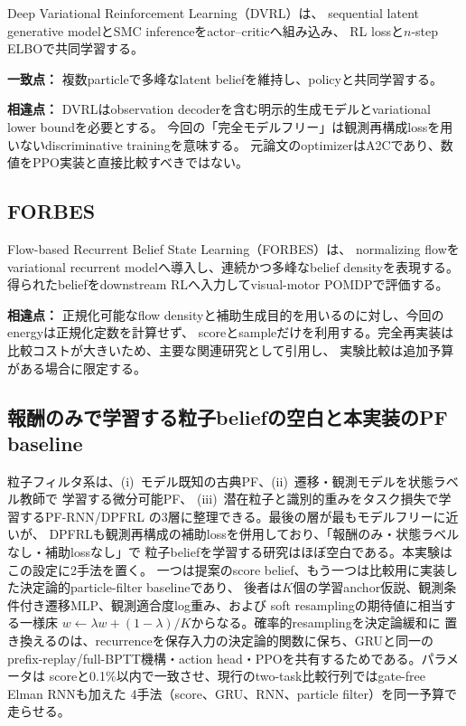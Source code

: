 \documentclass[a4paper,11pt]{article}
\newcommand{\matchpoint}{\par\noindent\textbf{一致点：}}
\newcommand{\difference}{\par\noindent\textbf{相違点：}}
\begin{document}
Deep Variational Reinforcement Learning（DVRL）\cite{igl2018dvrl}は、
sequential latent generative modelとSMC inferenceをactor--criticへ組み込み、
RL lossと$n$-step ELBOで共同学習する。

\matchpoint
複数particleで多峰なlatent beliefを維持し、policyと共同学習する。

\difference
DVRLはobservation decoderを含む明示的生成モデルとvariational lower boundを必要とする。
今回の「完全モデルフリー」は観測再構成lossを用いないdiscriminative trainingを意味する。
元論文のoptimizerはA2Cであり、数値をPPO実装と直接比較すべきではない。

\subsection{FORBES}

Flow-based Recurrent Belief State Learning（FORBES）\cite{chen2022forbes}は、
normalizing flowをvariational recurrent modelへ導入し、連続かつ多峰なbelief densityを表現する。
得られたbeliefをdownstream RLへ入力してvisual-motor POMDPで評価する。

\difference
正規化可能なflow densityと補助生成目的を用いるのに対し、今回のenergyは正規化定数を計算せず、
scoreとsampleだけを利用する。完全再実装は比較コストが大きいため、主要な関連研究として引用し、
実験比較は追加予算がある場合に限定する。

\subsection{報酬のみで学習する粒子beliefの空白と本実装のPF baseline}

粒子フィルタ系は、(i)~モデル既知の古典PF、(ii)~遷移・観測モデルを状態ラベル教師で
学習する微分可能PF\cite{jonschkowski2018dpf,karkus2018pfnet}、
(iii)~潜在粒子と識別的重みをタスク損失で学習するPF-RNN/DPFRL
\cite{ma2020pfrnn,ma2020dpfrl}の3層に整理できる。最後の層が最もモデルフリーに近いが、
DPFRLも観測再構成の補助lossを併用しており、「報酬のみ・状態ラベルなし・補助lossなし」で
粒子beliefを学習する研究はほぼ空白である。本実験はこの設定に2手法を置く。
一つは提案のscore belief、もう一つは比較用に実装した決定論的particle-filter baselineであり、
後者は$K$個の学習anchor仮説、観測条件付き遷移MLP、観測適合度log重み、および
soft resamplingの期待値に相当する一様床
$w\leftarrow\lambda w+(1-\lambda)/K$からなる。確率的resamplingを決定論緩和に
置き換えるのは、recurrenceを保存入力の決定論的関数に保ち、GRUと同一の
prefix-replay/full-BPTT機構・action head・PPOを共有するためである。パラメータは
scoreと0.1\%以内で一致させ、現行のtwo-task比較行列ではgate-free Elman RNNも加えた
4手法（score、GRU、RNN、particle filter）を同一予算で走らせる。
\end{document}
